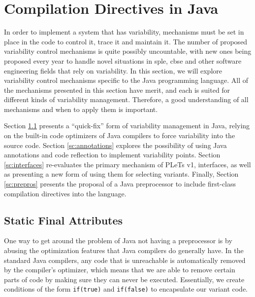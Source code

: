 
\section{Compilation Directives in Java}
\label{sc:compjava}

In order to implement a system that has \gls{variability}, mechanisms must be set in place in the code to control it, trace it and maintain it. The number of proposed \gls{variability} control mechanisms is quite possibly uncountable, with new ones being proposed every year to handle novel situations in \acrshort{sple}, \acrshort{cbse} and other software engineering fields that rely on \gls{variability}. In this section, we will explore \gls{variability} control mechanisms specific to the Java programming language. All of the mechanisms presented in this section have merit, and each is suited for different kinds of \gls{variability} management. Therefore, a good understanding of all mechanisms and when to apply them is important.

Section \ref{sc:sfa} presents a ``quick-fix'' form of \gls{variability} management in Java, relying on the built-in code optimizers of Java compilers to force \gls{variability} into the source code. Section \ref{sc:annotations} explores the possibility of using Java annotations and code reflection to implement \gls{variability} points. Section \ref{sc:interfaces} re-evaluates the primary mechanism of PLeTs v1, interfaces, as well as presenting a new form of using them for selecting \gls{variant}s. Finally, Section \ref{sc:prepros} presents the proposal of a Java preprocessor to include first-class compilation directives into the language.


\subsection{Static Final Attributes}
\label{sc:sfa}

One way to get around the problem of Java not having a preprocessor is by abusing the optimization features that Java compilers do generally have. In the standard Java compilers, any code that is unreachable is automatically removed by the compiler's optimizer, which means that we are able to remove certain parts of code by making sure they can never be executed. Essentially, we create conditions of the form \lstinline{if(true)} and \lstinline{if(false)} to encapsulate our \gls{variant} code.

